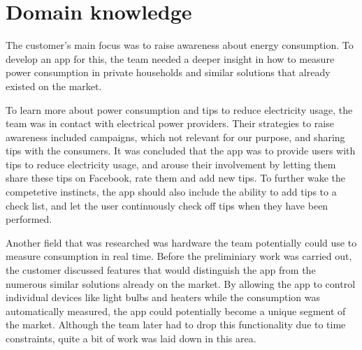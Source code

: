\section{Domain knowledge}
The customer's main focus was to raise awareness about energy consumption. To develop an app for this, the team needed a deeper insight in how to measure power consumption in private households and similar solutions that already existed on the market.

To learn more about power consumption and tips to reduce electricity usage, the team was in contact with electrical power providers. Their strategies to raise awareness included campaigns, which not relevant for our purpose, and sharing tips with the consumers. It was concluded that the app was to provide users with tips to reduce electricity usage, and arouse their involvement by letting them share these tips on Facebook, rate them and add new tips. To further wake the competetive instincts, the app should also include the ability to add tips to a check list, and let the user continuously check off tips when they have been performed.

Another field that was researched was hardware the team potentially could use to measure consumption in real time. Before the preliminiary work was carried out, the customer discussed features that would distinguish the app from the numerous similar solutions already on the market. By allowing the app to control individual devices like light bulbs and heaters while the consumption was automatically measured, the app could potentially become a unique segment of the market. Although the team later had to drop this functionality due to time constraints, quite a bit of work was laid down in this area. 



